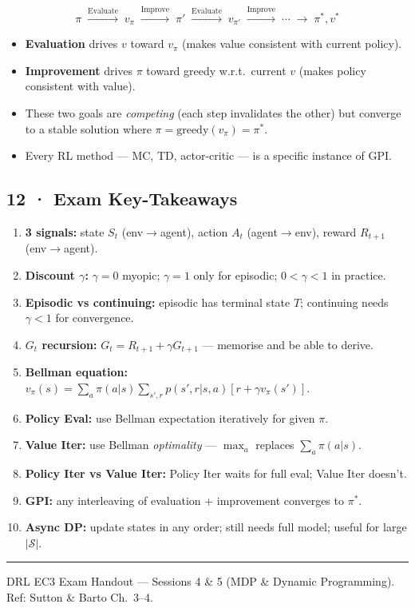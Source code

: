 \documentclass[11pt,a4paper]{article}
\begin{document}
\begin{tcolorbox}[defn={GPI — All RL is GPI}]
\[
  \pi \;\xrightarrow{\text{Evaluate}}\; v_\pi \;\xrightarrow{\text{Improve}}\; \pi' \;\xrightarrow{\text{Evaluate}}\; v_{\pi'} \;\xrightarrow{\text{Improve}}\; \cdots \;\to\; \pi^*, v^*
\]
\begin{itemize}
  \item \textbf{Evaluation} drives $v$ toward $v_\pi$ (makes value consistent with current policy).
  \item \textbf{Improvement} drives $\pi$ toward greedy w.r.t.\ current $v$ (makes policy consistent with value).
  \item These two goals are \emph{competing} (each step invalidates the other) but converge to a stable solution where $\pi = \text{greedy}(v_\pi) = \pi^*$.
  \item Every RL method — MC, TD, actor-critic — is a specific instance of GPI.
\end{itemize}
\end{tcolorbox}

\subsection*{12 · Exam Key-Takeaways}

\begin{tcolorbox}[exam={Must Know — Sessions 4 \& 5}]
\begin{enumerate}
  \item \textbf{3 signals:} state $S_t$ (env$\to$agent), action $A_t$ (agent$\to$env), reward $R_{t+1}$ (env$\to$agent).
  \item \textbf{Discount $\gamma$:} $\gamma=0$ myopic; $\gamma=1$ only for episodic; $0<\gamma<1$ in practice.
  \item \textbf{Episodic vs continuing:} episodic has terminal state $T$; continuing needs $\gamma<1$ for convergence.
  \item \textbf{$G_t$ recursion:} $G_t = R_{t+1} + \gamma G_{t+1}$ — memorise and be able to derive.
  \item \textbf{Bellman equation:} $v_\pi(s) = \sum_a \pi(a|s)\sum_{s',r} p(s',r|s,a)[r + \gamma v_\pi(s')]$.
  \item \textbf{Policy Eval:} use Bellman expectation iteratively for given $\pi$.
  \item \textbf{Value Iter:} use Bellman \emph{optimality} — $\max_a$ replaces $\sum_a\pi(a|s)$.
  \item \textbf{Policy Iter vs Value Iter:} Policy Iter waits for full eval; Value Iter doesn't.
  \item \textbf{GPI:} any interleaving of evaluation + improvement converges to $\pi^*$.
  \item \textbf{Async DP:} update states in any order; still needs full model; useful for large $|\mathcal{S}|$.
\end{enumerate}
\end{tcolorbox}

\vspace{4pt}
\hrule
\vspace{3pt}
{\footnotesize DRL EC3 Exam Handout — Sessions 4 \& 5 (MDP \& Dynamic Programming). Ref: Sutton \& Barto Ch.~3--4.}
\end{document}
